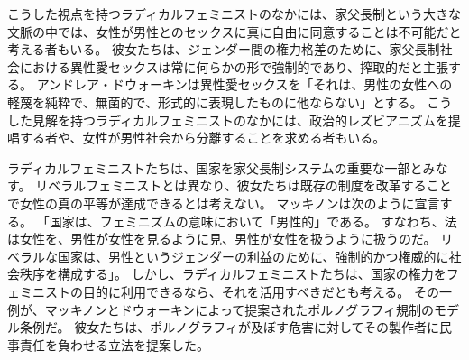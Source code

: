 \documentclass[paper=a4,book,openany]{jlreq}
\newcommand{\ig}[1]{}           %
\begin{document}
こうした視点を持つラディカルフェミニストのなかには、家父長制という大きな文脈の中では、女性が男性とのセックスに真に自由に同意することは不可能だと考える者もいる。
彼女たちは、ジェンダー間の権力格差のために、家父長制社会における異性愛セックスは常に何らかの形で強制的であり、搾取的だと主張する。
アンドレア・ドウォーキンは異性愛セックスを「それは、男性の女性への軽蔑を純粋で、無菌的で、形式的に表現したものに他ならない」とする\citep[p.138]{dworkin87:_inter}。
\ig{Andrea Dworkin}こうした見解を持つラディカルフェミニストのなかには、政治的レズビアニズムを提唱する者や、女性が男性社会から分離することを求める者もいる。

ラディカルフェミニストたちは、国家を家父長制システムの重要な一部とみなす。
リベラルフェミニストとは異なり、彼女たちは既存の制度を改革することで女性の真の平等が達成できるとは考えない。
マッキノンは次のように宣言する。
「国家は、フェミニズムの意味において「男性的」である。
すなわち、法は女性を、男性が女性を見るように見、男性が女性を扱うように扱うのだ。
リベラルな国家は、男性というジェンダーの利益のために、強制的かつ権威的に社会秩序を構成する」\citep[pp.161--162]{mackinnon89:_towar_femin_theor_of_state}。
しかし、ラディカルフェミニストたちは、国家の権力をフェミニストの目的に利用できるなら、それを活用すべきだとも考える。
その一例が、マッキノンとドウォーキンによって提案されたポルノグラフィ規制のモデル条例だ。
彼女たちは、ポルノグラフィが及ぼす危害に対してその製作者に民事責任を負わせる立法を提案した。
\end{document}
